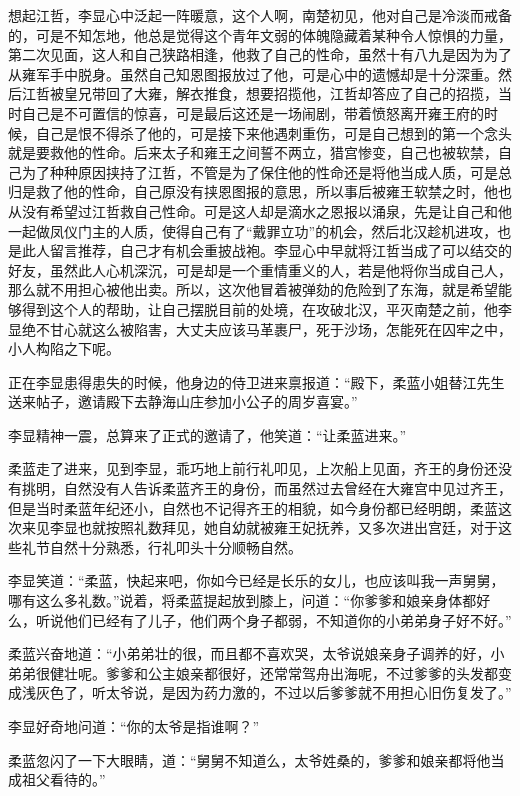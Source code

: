 想起江哲，李显心中泛起一阵暖意，这个人啊，南楚初见，他对自己是冷淡而戒备的，可是不知怎地，他总是觉得这个青年文弱的体魄隐藏着某种令人惊惧的力量，第二次见面，这人和自己狭路相逢，他救了自己的性命，虽然十有八九是因为为了从雍军手中脱身。虽然自己知恩图报放过了他，可是心中的遗憾却是十分深重。然后江哲被皇兄带回了大雍，解衣推食，想要招揽他，江哲却答应了自己的招揽，当时自己是不可置信的惊喜，可是最后这还是一场闹剧，带着愤怒离开雍王府的时候，自己是恨不得杀了他的，可是接下来他遇刺重伤，可是自己想到的第一个念头就是要救他的性命。后来太子和雍王之间誓不两立，猎宫惨变，自己也被软禁，自己为了种种原因挟持了江哲，不管是为了保住他的性命还是将他当成人质，可是总归是救了他的性命，自己原没有挟恩图报的意思，所以事后被雍王软禁之时，他也从没有希望过江哲救自己性命。可是这人却是滴水之恩报以涌泉，先是让自己和他一起做凤仪门主的人质，使得自己有了“戴罪立功”的机会，然后北汉趁机进攻，也是此人留言推荐，自己才有机会重披战袍。李显心中早就将江哲当成了可以结交的好友，虽然此人心机深沉，可是却是一个重情重义的人，若是他将你当成自己人，那么就不用担心被他出卖。所以，这次他冒着被弹劾的危险到了东海，就是希望能够得到这个人的帮助，让自己摆脱目前的处境，在攻破北汉，平灭南楚之前，他李显绝不甘心就这么被陷害，大丈夫应该马革裹尸，死于沙场，怎能死在囚牢之中，小人构陷之下呢。

正在李显患得患失的时候，他身边的侍卫进来禀报道：“殿下，柔蓝小姐替江先生送来帖子，邀请殿下去静海山庄参加小公子的周岁喜宴。”

李显精神一震，总算来了正式的邀请了，他笑道：“让柔蓝进来。”

柔蓝走了进来，见到李显，乖巧地上前行礼叩见，上次船上见面，齐王的身份还没有挑明，自然没有人告诉柔蓝齐王的身份，而虽然过去曾经在大雍宫中见过齐王，但是当时柔蓝年纪还小，自然也不记得齐王的相貌，如今身份都已经明朗，柔蓝这次来见李显也就按照礼数拜见，她自幼就被雍王妃抚养，又多次进出宫廷，对于这些礼节自然十分熟悉，行礼叩头十分顺畅自然。

李显笑道：“柔蓝，快起来吧，你如今已经是长乐的女儿，也应该叫我一声舅舅，哪有这么多礼数。”说着，将柔蓝提起放到膝上，问道：“你爹爹和娘亲身体都好么，听说他们已经有了儿子，他们两个身子都弱，不知道你的小弟弟身子好不好。”

柔蓝兴奋地道：“小弟弟壮的很，而且都不喜欢哭，太爷说娘亲身子调养的好，小弟弟很健壮呢。爹爹和公主娘亲都很好，还常常驾舟出海呢，不过爹爹的头发都变成浅灰色了，听太爷说，是因为药力激的，不过以后爹爹就不用担心旧伤复发了。”

李显好奇地问道：“你的太爷是指谁啊？”

柔蓝忽闪了一下大眼睛，道：“舅舅不知道么，太爷姓桑的，爹爹和娘亲都将他当成祖父看待的。”

